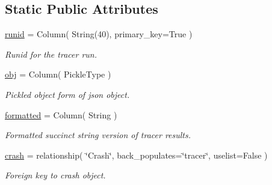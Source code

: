 \subsection*{Static Public Attributes}
\begin{DoxyCompactItemize}
\item 
\mbox{\label{classdb_1_1tracer_1_1_tracer_ad3aa7209ddeb56fbe3fc6b45c3b5fe79}} 
\mbox{\hyperlink{classdb_1_1tracer_1_1_tracer_ad3aa7209ddeb56fbe3fc6b45c3b5fe79}{runid}} = Column( String(40), primary\+\_\+key=True )
\begin{DoxyCompactList}\small\item\em Runid for the tracer run. \end{DoxyCompactList}\item 
\mbox{\label{classdb_1_1tracer_1_1_tracer_a558ca5c9c7f6004aa14bf354be869042}} 
\mbox{\hyperlink{classdb_1_1tracer_1_1_tracer_a558ca5c9c7f6004aa14bf354be869042}{obj}} = Column( Pickle\+Type )
\begin{DoxyCompactList}\small\item\em Pickled object form of json object. \end{DoxyCompactList}\item 
\mbox{\label{classdb_1_1tracer_1_1_tracer_ae6dc96b9d95be36d52dde3203cadd45a}} 
\mbox{\hyperlink{classdb_1_1tracer_1_1_tracer_ae6dc96b9d95be36d52dde3203cadd45a}{formatted}} = Column( String )
\begin{DoxyCompactList}\small\item\em Formatted succinct string version of tracer results. \end{DoxyCompactList}\item 
\mbox{\label{classdb_1_1tracer_1_1_tracer_a5e3830530e9197aa60fa2aec7e017cd0}} 
\mbox{\hyperlink{classdb_1_1tracer_1_1_tracer_a5e3830530e9197aa60fa2aec7e017cd0}{crash}} = relationship( \char`\"{}Crash\char`\"{}, back\+\_\+populates=\char`\"{}tracer\char`\"{}, uselist=False )
\begin{DoxyCompactList}\small\item\em Foreign key to crash object. \end{DoxyCompactList}\item 
\mbox{\label{classdb_1_1tracer_1_1_tracer_a421ab96c69a6d49d1ad4b4e8547196e4}} 

\end{DoxyCompactItemize}
